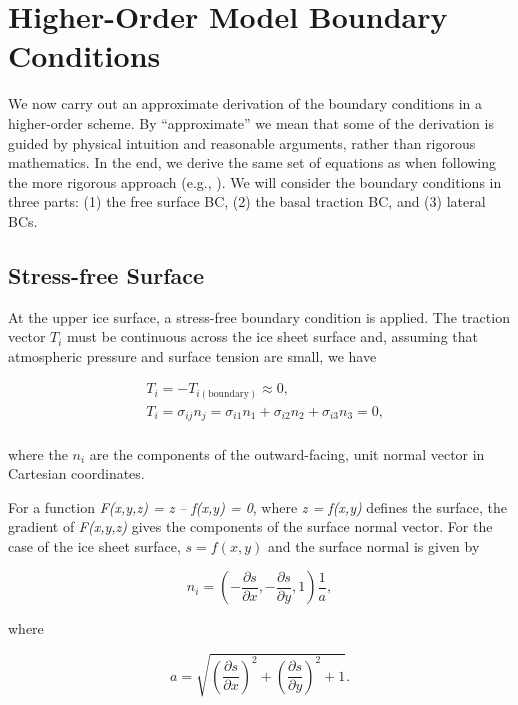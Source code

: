 
\section{Higher-Order Model Boundary Conditions}
\label{sc:higher-order-bcs}

We now carry out an approximate derivation of the boundary conditions in a higher-order scheme. By ``approximate'' we mean that some of the derivation is guided by physical intuition and reasonable arguments, rather than rigorous mathematics. In the end, we derive the same set of equations as when following the more rigorous approach (e.g., \citet{DUKOWICZ:2010wb}). We will consider the boundary conditions in three parts: (1) the free surface BC, (2) the basal traction BC, and (3) lateral BCs.

\subsection{Stress-free Surface}
At the upper ice surface, a stress-free boundary condition is applied. The traction vector $T_i$ must be continuous across the ice sheet surface and, assuming that atmospheric pressure and surface tension are small, we have

\begin{equation}
  \label{ho.eq.surface_traction}
  \begin{split}
    & T_{i} = -T_{i(\textrm{boundary})}\approx 0, \\ 
    & T_{i} = \sigma _{ij}n_{j} = \sigma _{i1}n_{1} + \sigma _{i2}n_{2} + \sigma _{i3}n_{3} = 0, \\
  \end{split}
\end{equation}

\noindent
where the $n_i$ are the components of the outward-facing, unit normal vector in Cartesian coordinates.

For a function \textit{F(x,y,z) = z -- f(x,y) = 0}, where \textit{z = f(x,y)} defines the surface, the gradient of \textit{F(x,y,z)} gives the components of the surface normal vector. For the case of the ice sheet surface, $s = f(x,y)$ and the surface normal is given by

\begin{equation}
  n_{i}=\left( -\frac{\partial s}{\partial x},-\frac{\partial s}{\partial y},1 \right)\frac{1}{a},
\end{equation}

\noindent
where

\begin{equation}
  a = \sqrt{\left( \frac{\partial s}{\partial x} \right)^{2} + \left( \frac{\partial s}{\partial y} \right)^{2} + 1}.
\end{equation}


